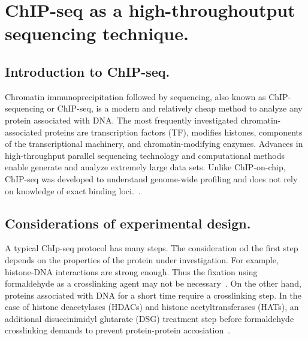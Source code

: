 \chapter{ChIP-seq as a high-throughoutput sequencing technique.}

\section{Introduction to ChIP-seq.}

Chromatin immunoprecipitation followed by sequencing, also known as ChIP-sequencing or ChIP-seq, is a modern and relatively cheap method to analyze any protein associated with DNA. 
The most frequently investigated chromatin-associated proteins are transcription factors (TF), modifies histones, components of the transcriptional machinery, and chromatin-modifying enzymes.
Advances in high-throughput parallel sequencing technology and computational methods enable generate and analyze extremely large data sets. 
Unlike ChIP-on-chip, ChIP-seq was developed to understand genome-wide profiling and does not rely on knowledge of exact binding loci.~\cite{park2009chip}.

\section{Considerations of experimental design.}

A typical ChIp-seq protocol has many steps. 
The consideration od the first step depends on the properties of the protein under investigation. 
For example, histone-DNA interactions are strong enough. 
Thus the fixation using formaldehyde as a crosslinking agent may not be necessary~\cite{barski2008identification}. 
On the other hand, proteins associated with DNA for a short time require a crosslinking step. 
In the case of histone deacetylases (HDACs) and histone acetyltransferases (HATs), an additional disuccinimidyl glutarate (DSG) treatment step before formaldehyde crosslinking demands to prevent protein-protein accosiation~\cite{wang2009genome}. 

